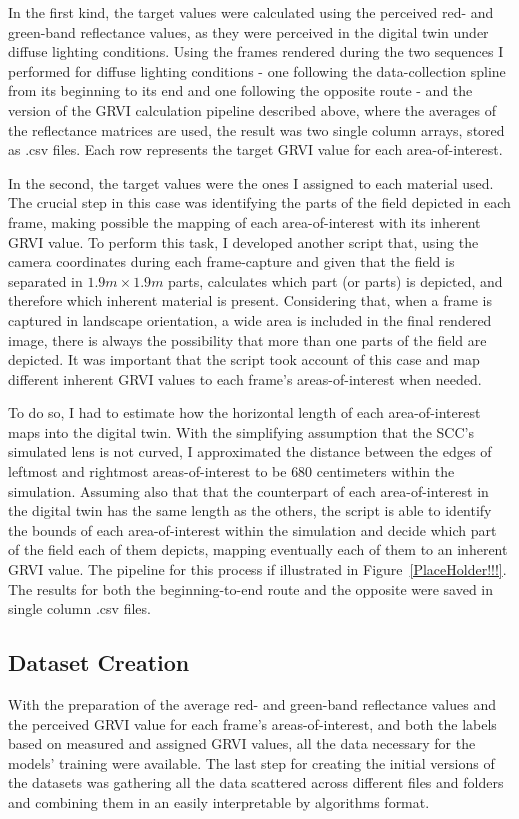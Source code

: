 In the first kind, the target values were calculated using the perceived red- and green-band reflectance values, as they were perceived in the digital twin under diffuse lighting conditions. Using the frames rendered during the two sequences I performed for diffuse lighting conditions - one following the data-collection spline from its beginning to its end and one following the opposite route - and the version of the GRVI calculation pipeline described above, where the averages of the reflectance matrices are used, the result was two single column arrays, stored as .csv files. Each row represents the target GRVI value for each area-of-interest.

In the second, the target values were the ones I assigned to each material used. The crucial step in this case was identifying the parts of the field depicted in each frame, making possible the mapping of each area-of-interest with its inherent GRVI value. To perform this task, I developed another script that, using the camera coordinates during each frame-capture and given that the field is separated in $1.9m \times 1.9m$ parts, calculates which part (or parts) is depicted, and therefore which inherent material is present. Considering that, when a frame is captured in landscape orientation, a wide area is included in the final rendered image, there is always the possibility that more than one parts of the field are depicted. It was important that the script took account of this case and map different inherent GRVI values to each frame's areas-of-interest when needed. 

To do so, I had to estimate how the horizontal length of each area-of-interest maps into the digital twin. With the simplifying assumption that the SCC's simulated lens is not curved, I approximated the distance between the edges of leftmost and rightmost areas-of-interest to be $680$ centimeters within the simulation. Assuming also that that the counterpart of each area-of-interest in the digital twin has the same length as the others, the script is able to identify the bounds of each area-of-interest within the simulation and decide which part of the field each of them depicts, mapping eventually each of them to an inherent GRVI value. The pipeline for this process if illustrated in Figure~\ref{PlaceHolder!!!}. The results for both the beginning-to-end route and the opposite were saved in single column .csv files.

\subsection{Dataset Creation}
With the preparation of the average red- and green-band reflectance values and the perceived GRVI value for each frame's areas-of-interest, and both the labels based on measured and assigned GRVI values, all the data necessary for the models' training were available. The last step for creating the initial versions of the datasets was gathering all the data scattered across different files and folders and combining them in an easily interpretable by algorithms format.

